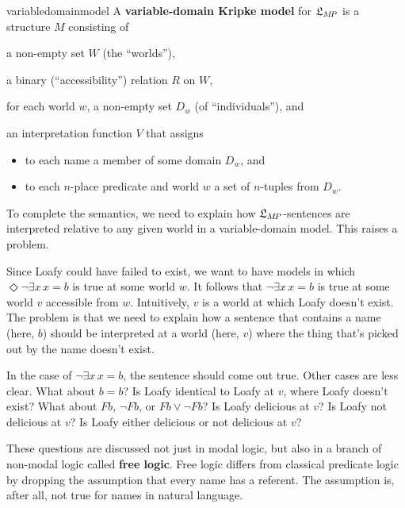 \begin{definition}{}{variabledomainmodel}
  A \textbf{variable-domain Kripke model} for $\mathfrak{L}_{M\!P}$ is a structure $M$
  consisting of%
  \medskip
  \begin{compactenum}
  \item a non-empty set $W$ (the ``worlds''),
  \item a binary (``accessibility'') relation $R$ on $W$,
  \item for each world $w$, a non-empty set $D_w$ (of ``individuals''), and
  \item an interpretation function $V$ that assigns
    \vspace{-1mm}
    \begin{itemize}
      \itemsep-1mm
      \item to each name a member of some domain $D_w$, and
      \item to each $n$-place predicate and world $w$ a set of $n$-tuples from
            $D_w$.
    \end{itemize}
  \end{compactenum}
\end{definition}

To complete the semantics, we need to explain how $\mathfrak{L}_{M\!P}$-sentences are
interpreted relative to any given world in a variable-domain model. This raises
a problem.

Since Loafy could have failed to exist, we want to have models in which
$\Diamond \neg \exists x\, {x\!=\!b}$ is true at some world $w$. It follows that
$\neg \exists x\, x\!=\!b$ is true at some world $v$ accessible from $w$.
Intuitively, $v$ is a world at which Loafy doesn't exist. The problem is that we
need to explain how a sentence that contains a name (here, $b$) should be
interpreted at a world (here, $v$) where the thing that's picked out by the name
doesn't exist.

In the case of $\neg \exists x\, x\!=\!b$, the sentence should come out true.
Other cases are less clear. What about $b\!=\!b$? Is Loafy identical to Loafy at
$v$, where Loafy doesn't exist? What about $Fb$, $\neg Fb$, or
$Fb \lor \neg Fb$? Is Loafy delicious at $v$? Is Loafy not delicious at $v$? Is
Loafy either delicious or not delicious at $v$?

These questions are discussed not just in modal logic, but also in a branch of
non-modal logic called \textbf{free logic}. Free logic differs from classical
predicate logic by dropping the assumption that every name has a referent. The
assumption is, after all, not true for names in natural language.

